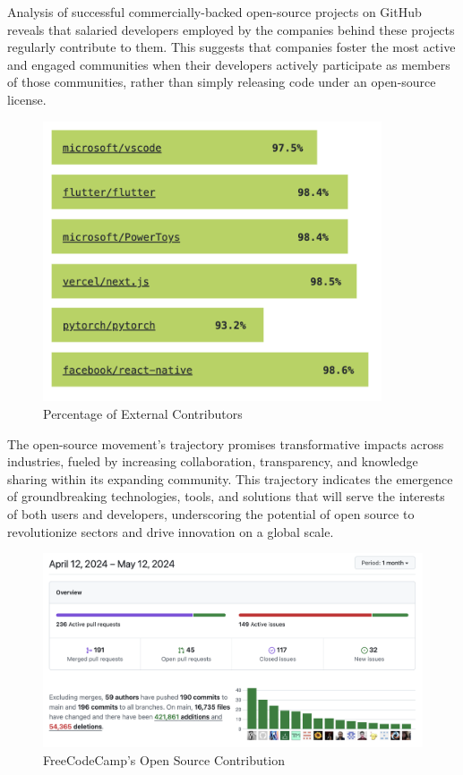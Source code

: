 Analysis of successful commercially-backed open-source projects on GitHub reveals that salaried developers employed by the companies behind these projects regularly contribute to them. This suggests that companies foster the most active and engaged communities when their developers actively participate as members of those communities, rather than simply releasing code under an open-source license.

\begin{figure}[ht]
    \includegraphics[width=10cm]{figs/percent_external_contributors.png}
    \centering
    \caption{Percentage of External Contributors}
    \label{fig:percent_external_contributors}
\end{figure}

The open-source movement's trajectory promises transformative impacts across industries, fueled by increasing collaboration, transparency, and knowledge sharing within its expanding community. This trajectory indicates the emergence of groundbreaking technologies, tools, and solutions that will serve the interests of both users and developers, underscoring the potential of open source to revolutionize sectors and drive innovation on a global scale.


\begin{figure}[ht]
    \includegraphics[width=1\linewidth]{figs/freecodecamp.png}
    \centering
    \caption{FreeCodeCamp's Open Source Contribution}
    \label{fig:freeCodeCamp}
\end{figure}





\clearpage  %
